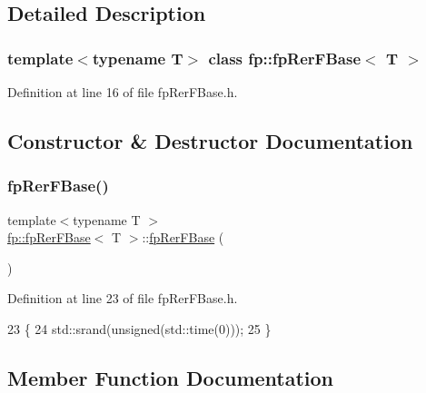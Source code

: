 \subsection{Detailed Description}
\subsubsection*{template$<$typename T$>$\newline
class fp\+::fp\+Rer\+F\+Base$<$ T $>$}



Definition at line 16 of file fp\+Rer\+F\+Base.\+h.



\subsection{Constructor \& Destructor Documentation}
\mbox{\label{classfp_1_1fpRerFBase_a3c48a1913e8affa4a4a3b2373207dbd4}} 
\subsubsection{\texorpdfstring{fp\+Rer\+F\+Base()}{fpRerFBase()}}
{\footnotesize\ttfamily template$<$typename T $>$ \\
\hyperlink{classfp_1_1fpRerFBase}{fp\+::fp\+Rer\+F\+Base}$<$ T $>$\+::\hyperlink{classfp_1_1fpRerFBase}{fp\+Rer\+F\+Base} (\begin{DoxyParamCaption}{ }\end{DoxyParamCaption})\hspace{0.3cm}{\ttfamily [inline]}}



Definition at line 23 of file fp\+Rer\+F\+Base.\+h.


\begin{DoxyCode}
23                         \{
24                 std::srand(\textcolor{keywordtype}{unsigned}(std::time(0)));
25             \}
\end{DoxyCode}


\subsection{Member Function Documentation}
\mbox{\label{classfp_1_1fpRerFBase_a4aa9be48cadab132857ea9d9da18fe8a}} 
